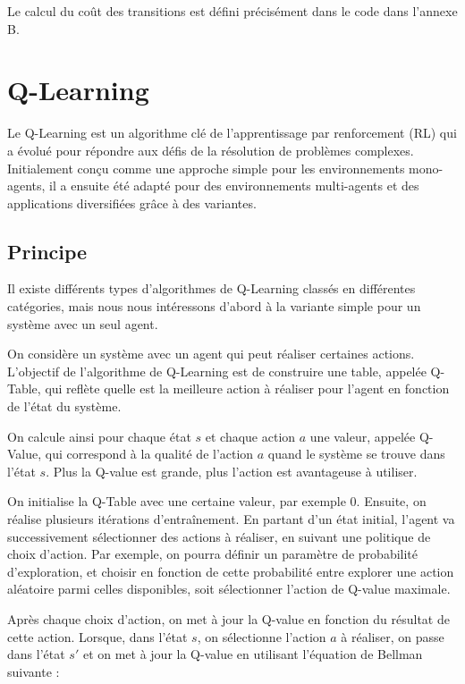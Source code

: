 \documentclass[a4paper]{article}
\begin{document}
    Le calcul du coût des transitions est défini précisément dans le code dans l'annexe B.

    \section{Q-Learning}

    Le Q-Learning est un algorithme clé de l'apprentissage par renforcement (RL) qui a évolué pour répondre aux défis de la résolution de problèmes complexes. Initialement conçu comme une approche simple pour les environnements mono-agents, il a ensuite été adapté pour des environnements multi-agents et des applications diversifiées grâce à des variantes.

    \subsection{Principe}

    Il existe différents types d'algorithmes de Q-Learning \cite{jang_Q-Learning_2019} classés en différentes catégories, mais nous nous intéressons d'abord à la variante simple pour un système avec un seul agent.

    On considère un système avec un agent qui peut réaliser certaines actions.
    L'objectif de l'algorithme de Q-Learning est de construire une table, appelée Q-Table, qui reflète quelle est la meilleure action à réaliser pour l'agent en fonction de l'état du système.

    On calcule ainsi pour chaque état $s$ et chaque action $a$ une valeur, appelée Q-Value, qui correspond à la qualité de l'action $a$ quand le système se trouve dans l'état $s$.
    Plus la Q-value est grande, plus l'action est avantageuse à utiliser.

    On initialise la Q-Table avec une certaine valeur, par exemple 0.
    Ensuite, on réalise plusieurs itérations d'entraînement. En partant d'un état initial, l'agent va successivement sélectionner des actions à réaliser, en suivant une politique de choix d'action.
    Par exemple, on pourra définir un paramètre de probabilité d'exploration, et choisir en fonction de cette probabilité entre explorer une action aléatoire parmi celles disponibles, soit sélectionner l'action de Q-value maximale.

    Après chaque choix d'action, on met à jour la Q-value en fonction du résultat de cette action.
    Lorsque, dans l'état $s$, on sélectionne l'action $a$ à réaliser, on passe dans l'état $s'$ et on met à jour la Q-value en utilisant l'équation de Bellman suivante :
\end{document}
